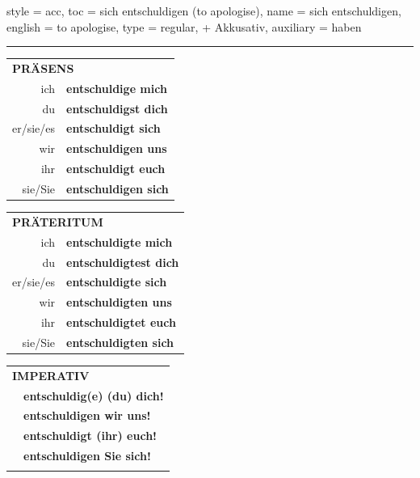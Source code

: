 \begin{verbentry}{
  style = {acc},
  toc = {sich entschuldigen (to apologise)},
  name = {sich entschuldigen},
  english = {to apologise},
  type = {regular, + Akkusativ},
  auxiliary = {haben}
}
 
    
       \vspace{5pt}

    \hrule
    
    \vspace{5pt}

  \begin{tabular}{rl}
     \multicolumn{2}{l}{\textbf{PRÄSENS} }\\
    ich & \textbf{entschuldige mich}\\
    du & \textbf{entschuldigst dich}\\
    er/sie/es & \textbf{entschuldigt sich}\\
    wir & \textbf{entschuldigen uns}\\
    ihr & \textbf{entschuldigt euch}\\
    sie/Sie & \textbf{entschuldigen sich}\\
  \end{tabular}
  \hfill
     \begin{tabular}{rl}
    \multicolumn{2}{l}{\textbf{PRÄTERITUM} }\\
    ich & \textbf{entschuldigte mich}\\
    du & \textbf{entschuldigtest dich}\\
    er/sie/es & \textbf{entschuldigte sich}\\
    wir & \textbf{entschuldigten uns}\\
    ihr & \textbf{entschuldigtet euch}\\
    sie/Sie & \textbf{entschuldigten sich}\\
  \end{tabular}
  \hfill
  \begin{tabular}{rl}
     \multicolumn{2}{l}{\textbf{IMPERATIV} }\\
   & \textbf{entschuldig(e) (du) dich!}\\
   & \textbf{entschuldigen wir uns!}\\
   & \textbf{entschuldigt (ihr) euch!}\\
   & \textbf{entschuldigen Sie sich!}\\
   & \vspace{10pt}
  \end{tabular}


\end{verbentry}
